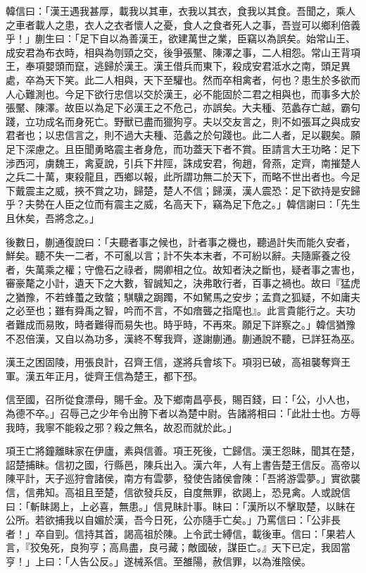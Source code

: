 \begin{pinyinscope}
韓信曰：「漢王遇我甚厚，載我以其車，衣我以其衣，食我以其食。吾聞之，乘人之車者載人之患，衣人之衣者懷人之憂，食人之食者死人之事，吾豈可以鄉利倍義乎！」蒯生曰：「足下自以為善漢王，欲建萬世之業，臣竊以為誤矣。始常山王、成安君為布衣時，相與為刎頸之交，後爭張黶、陳澤之事，二人相怨。常山王背項王，奉項嬰頭而竄，逃歸於漢王。漢王借兵而東下，殺成安君泜水之南，頭足異處，卒為天下笑。此二人相與，天下至驩也。然而卒相禽者，何也？患生於多欲而人心難測也。今足下欲行忠信以交於漢王，必不能固於二君之相與也，而事多大於張黶、陳澤。故臣以為足下必漢王之不危己，亦誤矣。大夫種、范蠡存亡越，霸句踐，立功成名而身死亡。野獸已盡而獵狗亨。夫以交友言之，則不如張耳之與成安君者也；以忠信言之，則不過大夫種、范蠡之於句踐也。此二人者，足以觀矣。願足下深慮之。且臣聞勇略震主者身危，而功蓋天下者不賞。臣請言大王功略：足下涉西河，虜魏王，禽夏說，引兵下井陘，誅成安君，徇趙，脅燕，定齊，南摧楚人之兵二十萬，東殺龍且，西鄉以報，此所謂功無二於天下，而略不世出者也。今足下戴震主之威，挾不賞之功，歸楚，楚人不信；歸漢，漢人震恐：足下欲持是安歸乎？夫勢在人臣之位而有震主之威，名高天下，竊為足下危之。」韓信謝曰：「先生且休矣，吾將念之。」

後數日，蒯通復說曰：「夫聽者事之候也，計者事之機也，聽過計失而能久安者，鮮矣。聽不失一二者，不可亂以言；計不失本末者，不可紛以辭。夫隨廝養之役者，失萬乘之權；守儋石之祿者，闕卿相之位。故知者決之斷也，疑者事之害也，審豪氂之小計，遺天下之大數，智誠知之，決弗敢行者，百事之禍也。故曰『猛虎之猶豫，不若蜂蠆之致螫；騏驥之跼躅，不如駑馬之安步；孟賁之狐疑，不如庸夫之必至也；雖有舜禹之智，吟而不言，不如瘖聾之指麾也』。此言貴能行之。夫功者難成而易敗，時者難得而易失也。時乎時，不再來。願足下詳察之。」韓信猶豫不忍倍漢，又自以為功多，漢終不奪我齊，遂謝蒯通。蒯通說不聽，已詳狂為巫。

漢王之困固陵，用張良計，召齊王信，遂將兵會垓下。項羽已破，高祖襲奪齊王軍。漢五年正月，徙齊王信為楚王，都下邳。

信至國，召所從食漂母，賜千金。及下鄉南昌亭長，賜百錢，曰：「公，小人也，為德不卒。」召辱己之少年令出胯下者以為楚中尉。告諸將相曰：「此壯士也。方辱我時，我寧不能殺之邪？殺之無名，故忍而就於此。」

項王亡將鐘離眛家在伊廬，素與信善。項王死後，亡歸信。漢王怨眛，聞其在楚，詔楚捕眛。信初之國，行縣邑，陳兵出入。漢六年，人有上書告楚王信反。高帝以陳平計，天子巡狩會諸侯，南方有雲夢，發使告諸侯會陳：「吾將游雲夢。」實欲襲信，信弗知。高祖且至楚，信欲發兵反，自度無罪，欲謁上，恐見禽。人或說信曰：「斬眛謁上，上必喜，無患。」信見眛計事。眛曰：「漢所以不擊取楚，以眛在公所。若欲捕我以自媚於漢，吾今日死，公亦隨手亡矣。」乃罵信曰：「公非長者！」卒自剄。信持其首，謁高祖於陳。上令武士縛信，載後車。信曰：「果若人言，『狡兔死，良狗亨；高鳥盡，良弓藏；敵國破，謀臣亡。』天下已定，我固當亨！」上曰：「人告公反。」遂械系信。至雒陽，赦信罪，以為淮陰侯。


\end{pinyinscope}
